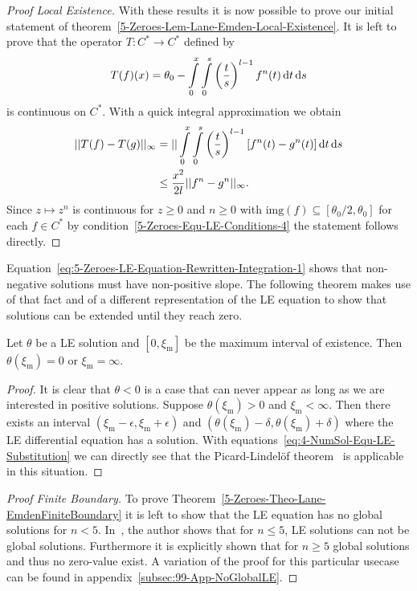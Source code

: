 \begin{proof}[Proof  Local Existence]
	With these results it is now possible to prove our initial statement of theorem~\ref{5-Zeroes-Lem-Lane-Emden-Local-Existence}.
	It is left to prove that the operator $T:C^*\rightarrow C^*$ defined by
	\begin{equation}
		T(f)(x) = \theta_0 - \int\limits_0^x\int\limits_0^s \left(\frac{t}{s}\right)^{l-1}f^n(t)\mathop{}\!\mathrm{d} t\mathop{}\!\mathrm{d} s
		\label{eq:5-Zeroes-LE-Definition-Operator-On-C-Star}
	\end{equation}
	is continuous on $C^*$.
	With a quick integral approximation we obtain
	\begin{align}
		||T(f)-T(g)||_{\infty} &= ||\int\limits_0^x\int\limits_0^s \left(\frac{t}{s}\right)^{l-1}\left[f^n(t)-g^n(t)\right]\mathop{}\!\mathrm{d} t\mathop{}\!\mathrm{d} s\\
		&\leq \frac{x^2}{2l}||f^n-g^n||_{\infty}.
	\end{align}
	Since $z\mapsto z^n$ is continuous for $z\geq0$ and $n\geq0$ with $\mathrm{img}(f)\subseteq[\theta_0/2,\theta_0]$ for each $f\in C^*$ by condition~\eqref{5-Zeroes-Equ-LE-Conditions-4} the statement follows directly.
\end{proof}\noindent
Equation~\eqref{eq:5-Zeroes-LE-Equation-Rewritten-Integration-1} shows that non-negative solutions must have non-positive slope.
The following theorem makes use of that fact and of a different representation of the \ac{LE} equation to show that solutions can be extended until they reach zero.
\begin{lemma}
	Let $\theta$ be a \ac{LE} solution and $[0,\xi_\textrm{m}]$ be the maximum interval of existence.
	Then $\theta(\xi_\textrm{m})=0$ or $\xi_\textrm{m}=\infty$.
\end{lemma}
\begin{proof}
	It is clear that $\theta<0$ is a case that can never appear as long as we are interested in positive solutions.
	Suppose $\theta(\xi_\textrm{m})>0$ and $\xi_\textrm{m}<\infty$.
	Then there exists an interval $(\xi_\textrm{m}-\epsilon,\xi_\textrm{m}+\epsilon)$ and $(\theta(\xi_\textrm{m})-\delta,\theta(\xi_\textrm{m})+\delta)$ where the \ac{LE} differential equation has a solution.
	With equations~\ref{eq:4-NumSol-Equ-LE-Substitution} we can directly see that the Picard-Lindelöf theorem~\cite{lindelofApplicationMethodeApproximations1894} is applicable in this situation.
\end{proof}
\begin{proof}[Proof  Finite Boundary]
	To prove Theorem~\ref{5-Zeroes-Theo-Lane-EmdenFiniteBoundary} it is left to show that the \ac{LE} equation has no global solutions for $n<5$.
	In~\cite[p.~36]{quittnerSuperlinearParabolicProblems2007}, the author shows that for $n\leq5$, \ac{LE} solutions can not be global solutions.
	Furthermore it is explicitly shown that for $n\geq5$ global solutions and thus no zero-value exist.
	A variation of the proof for this particular usecase can be found in appendix~\ref{subsec:99-App-NoGlobalLE}.
\end{proof}
%
%
